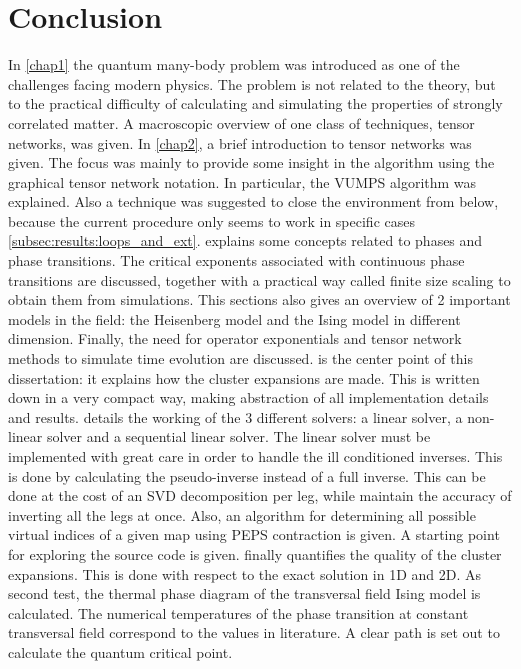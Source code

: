 \section{Conclusion}

In \cref{chap1} the quantum many-body problem was introduced as one of the challenges facing modern physics. The problem is not related to the theory, but to the practical difficulty of calculating and simulating the properties of strongly correlated matter. A macroscopic overview of one class of techniques, tensor networks, was given.
In \cref{chap2}, a brief introduction to tensor networks was given. The focus was mainly to provide some insight in the algorithm using the graphical tensor network notation. In particular, the VUMPS algorithm was explained. Also a technique was suggested to close the environment from below, because the current procedure only seems to work in specific cases \cref{subsec:results:loops_and_ext}.
 explains some concepts related to phases and phase transitions. The critical exponents associated with continuous phase transitions are discussed, together with a practical way called finite size scaling to obtain them from simulations. This sections also gives an overview of 2 important models in the field: the Heisenberg model and the Ising model in different dimension. Finally, the need for operator exponentials and tensor network methods to simulate time evolution are discussed.
 is the center point of this dissertation: it explains how the cluster expansions are made. This is written down in a very compact way, making abstraction of all implementation details and results.
 details the working of the 3 different solvers: a linear solver, a non-linear solver and a sequential linear solver. The linear solver must be implemented with great care in order to handle the ill conditioned inverses. This is done by calculating the pseudo-inverse instead of a full inverse. This can be done at the cost of an SVD decomposition per leg, while maintain the accuracy of inverting all the legs at once. Also, an algorithm for determining all possible virtual indices of a given map using PEPS contraction is given.  A starting point for exploring the source code is given.
 finally quantifies the quality of the cluster expansions. This is done with respect to the exact solution in 1D and 2D. As second test, the thermal phase diagram of the transversal field Ising model is calculated. The numerical temperatures of the phase transition at constant transversal field correspond to the values in literature. A clear path is set out to calculate the quantum critical point.

